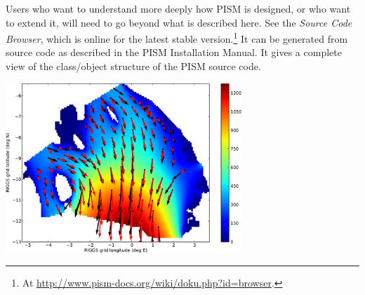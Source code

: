 \documentclass[titlepage,letterpaper,final]{scrartcl}
\begin{document}
Users who want to understand more deeply how PISM is designed, or who want to extend it,  will need to go beyond what is described here.  See the \emph{Source Code Browser}, which is online for the latest stable version.\footnote{At \url{http://www.pism-docs.org/wiki/doku.php?id=browser}.}  It can be generated from source code as described in the PISM Installation Manual.  It gives a complete view of the class/object structure of the PISM source code.


\vspace{.3in}
  
\begin{center}
\includegraphics[width=3.5in,keepaspectratio=true]{rossquiver}
\end{center}

\vspace{.2in}

\begin{center}
\end{center}


\clearpage\newpage


\clearpage\newpage


\clearpage\newpage


\clearpage\newpage


\clearpage\newpage


\clearpage\newpage

\end{document}
